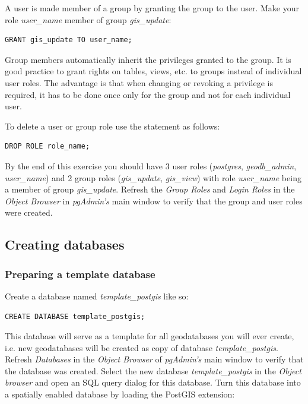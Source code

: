 \documentclass[a4paper,12pt,titlepage]{article}
\begin{document}
A user is made member of a group by granting the group to the user. Make your role \textit{user\_name} member of group \textit{gis\_update}:

\begin{lstlisting}[caption={Adding a user to a group},label=lst:add_group_member]
GRANT gis_update TO user_name;
\end{lstlisting}

Group members automatically inherit the privileges granted to the group. It is good practice to grant rights on tables, views, etc. to groups instead of individual user roles. The advantage is that when changing or revoking a privilege is required, it has to be done once only for the group and not for each individual user.

To delete a user or group role use the statement as follows:

\begin{lstlisting}[caption={Deleting a role},label=lst:del_role]
DROP ROLE role_name;
\end{lstlisting}

By the end of this exercise you should have 3 user roles (\textit{postgres}, \textit{geodb\_admin}, \textit{user\_name}) and 2 group roles (\textit{gis\_update}, \textit{gis\_view}) with role \textit{user\_name} being a member of group \textit{gis\_update}. Refresh the \textit{Group Roles} and \textit{Login Roles} in the \textit{Object Browser} in \textit{pgAdmin's} main window to verify that the group and user roles were created.

\subsection{Creating databases}

\subsubsection{Preparing a template database}

Create a database named \textit{template\_postgis} like so:

\begin{lstlisting}[caption={Creating a database},label=lst:create_db]
CREATE DATABASE template_postgis;
\end{lstlisting}

This database will serve as a template for all geodatabases you will ever create, i.e. new geodatabases will be created as copy of database \textit{template\_postgis}.
Refresh \textit{Databases} in the \textit{Object Browser} of \textit{pgAdmin's} main window to verify that the database was created. Select the new database \textit{template\_postgis} in the \textit{Object browser} and open an SQL query dialog for this database. Turn this database into a spatially enabled database by loading the PostGIS extension:
\end{document}
